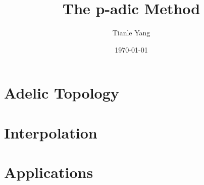 \documentclass[sectionlevel=chapter,status=draft]{noteformyself}
\title{The p-adic Method}
\author{Tianle Yang}
\date{\today}
\begin{document}
    \maketitle

    \tableofcontents

    \section[
      status=draft,
      tag=00000,
      label=\labelNFM{sec:p-adic-method:adelic-topology}
    ]{Adelic Topology}
    
    \section[
      status=draft,
      tag=00000,
      label=\labelNFM{sec:p-adic-method:interpolation}
    ]{Interpolation}
    
    \section[
      status=draft,
      tag=00000,
      label=\labelNFM{sec:p-adic-method:applications}
    ]{Applications}
    



    \printbibliography[heading=bibintoc, title={References}]
\end{document}

